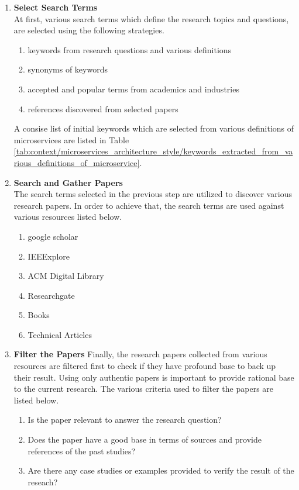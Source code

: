 \begin{enumerate}
\item \textbf{Select Search Terms}\\
At first, various search terms which define the research topics and questions, are selected using the following strategies.
\begin{enumerate}
\item keywords from research questions and various definitions
\item synonyms of keywords
\item accepted and popular terms from academics and industries
\item references discovered from selected papers
\end{enumerate}
A consise list of initial keywords which are selected from various definitions of microservices are listed in Table \ref{tab:context/microservices_architecture_style/keywords_extracted_from_various_definitions_of_microservice}.
\item \textbf{Search and Gather Papers}\\
The search terms selected in the previous step are utilized to discover various research papers. In order to achieve that, the search terms are used against various resources listed below.
\begin{enumerate}
\item google scholar
\item IEEExplore
\item ACM Digital Library
\item Researchgate
\item Books
\item Technical Articles
\end{enumerate}
\item \textbf{Filter the Papers}
Finally, the research papers collected from various resources are filtered first to check if they have profound base to back up their result. Using only authentic papers is important to provide rational base to the current research. The various criteria used to filter the papers are listed below.
\begin{enumerate}
\item Is the paper relevant to answer the research question?
\item Does the paper have a good base in terms of sources and provide references of the past studies? 
\item Are there any case studies or examples provided to verify the result of the reseach?
\end{enumerate}
\end{enumerate}

